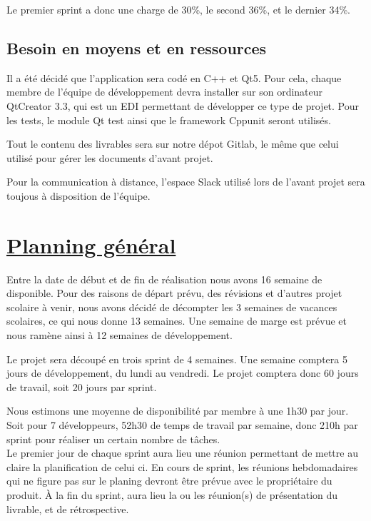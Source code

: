 \documentclass{../res/univ-projet}
\begin{document}
Le premier sprint a donc une charge de 30\%, le second 36\%, et le dernier 34\%.

\subsection{Besoin en moyens et en ressources}

Il a été décidé que l'application sera codé en C++ et Qt5. Pour cela, chaque membre de l'équipe de développement devra installer sur son ordinateur 
QtCreator 3.3, qui est un EDI permettant de développer ce type de projet. Pour les tests, le module Qt test ainsi que le framework Cppunit seront utilisés.

Tout le contenu des livrables sera sur notre dépot Gitlab, le même que celui utilisé pour gérer les documents d'avant projet.

Pour la communication à distance, l'espace Slack utilisé lors de l'avant projet sera toujous à disposition de l'équipe.
\newpage

\section{\underline{Planning général}}

Entre la date de début et de fin de réalisation nous avons 16 semaine de disponible. Pour des raisons de départ prévu, des révisions et d'autres projet 
scolaire à venir, nous avons décidé de décompter les 3 semaines de vacances scolaires, ce qui nous donne 13 semaines. Une semaine de marge est prévue 
et nous ramène ainsi à 12 semaines de développement. 

Le projet sera découpé en trois sprint de 4 semaines. Une semaine comptera 5 jours de développement, du lundi au 
vendredi. Le projet comptera donc 60 jours de travail, soit 20 jours par sprint.

Nous estimons une moyenne de disponibilité par membre à une 1h30 par jour. Soit pour 7 développeurs, 52h30 de temps de travail par semaine, donc 
210h par sprint pour réaliser un certain nombre de tâches. \\

Le premier jour de chaque sprint aura lieu une réunion permettant de mettre au claire la planification de celui ci. En cours de sprint, les réunions 
hebdomadaires qui ne figure pas sur le planing devront être prévue avec le propriétaire du produit. \`{A} la fin du sprint, aura lieu la 
ou les réunion(s) de présentation du livrable, et de rétrospective. \\
\end{document}
